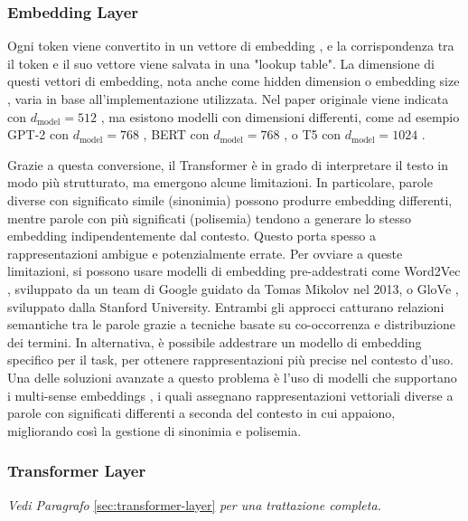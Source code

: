 \subsubsection{Embedding Layer}
Ogni token viene convertito in un vettore di embedding \cite{mikolov2013distributedrepresentationswordsphrases}, e la corrispondenza tra il token e il suo vettore viene salvata in una "lookup table". La dimensione di questi vettori di embedding, nota anche come hidden dimension \cite{gpt2backbone} o embedding size \cite{devlin2019bertpretrainingdeepbidirectional}, varia in base all'implementazione utilizzata. Nel paper originale viene indicata con $d_{\text{model}} = 512$ \cite{vaswani2023attentionneed}, ma esistono modelli con dimensioni differenti, come ad esempio GPT-2 con $d_{\text{model}} = 768$ \cite{gpt2backbone}, BERT con $d_{\text{model}} = 768$ \cite{devlin2019bertpretrainingdeepbidirectional}, o T5 con $d_{\text{model}} = 1024$ \cite{raffel2023exploringlimitstransferlearning}.

Grazie a questa conversione, il Transformer è in grado di interpretare il testo in modo più strutturato, ma emergono alcune limitazioni. In particolare, parole diverse con significato simile (sinonimia) possono produrre embedding differenti, mentre parole con più significati (polisemia) tendono a generare lo stesso embedding indipendentemente dal contesto. Questo porta spesso a rappresentazioni ambigue e potenzialmente errate.
Per ovviare a queste limitazioni, si possono usare modelli di embedding pre-addestrati come Word2Vec \cite{mikolov2013efficientestimationwordrepresentations}, sviluppato da un team di Google guidato da Tomas Mikolov nel 2013, o GloVe \cite{pennington-etal-2014-glove}, sviluppato dalla Stanford University. Entrambi gli approcci catturano relazioni semantiche tra le parole grazie a tecniche basate su co-occorrenza e distribuzione dei termini.
In alternativa, è possibile addestrare un modello di embedding specifico per il task, per ottenere rappresentazioni più precise nel contesto d'uso. Una delle soluzioni avanzate a questo problema è l'uso di modelli che supportano i multi-sense embeddings \cite{camachocollados2018wordsenseembeddingssurvey,reisinger-mooney-2010-multi}, i quali assegnano rappresentazioni vettoriali diverse a parole con significati differenti a seconda del contesto in cui appaiono, migliorando così la gestione di sinonimia e polisemia.

\subsubsection{Transformer Layer}
\textit{Vedi Paragrafo} \ref{sec:transformer-layer} \textit{per una trattazione completa.}


